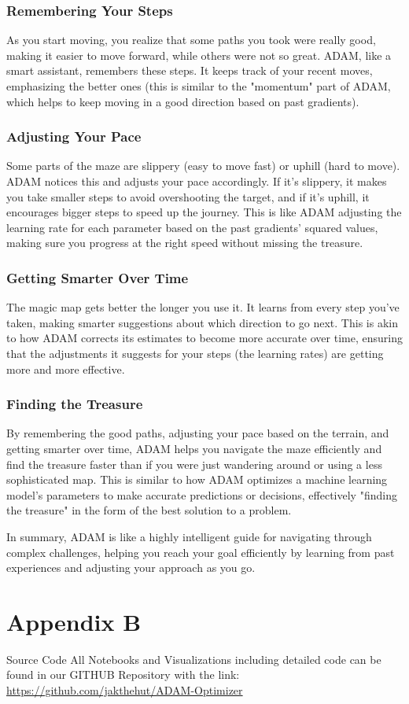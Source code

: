 \documentclass[journal]{IEEEtran}
\begin{document}
\subsubsection*{Remembering Your Steps}
As you start moving, you realize that some paths you took were really good, making it easier to move forward, while others were not so great. ADAM, like a smart assistant, remembers these steps. It keeps track of your recent moves, emphasizing the better ones (this is similar to the "momentum" part of ADAM, which helps to keep moving in a good direction based on past gradients).

\subsubsection*{Adjusting Your Pace}
Some parts of the maze are slippery (easy to move fast) or uphill (hard to move). ADAM notices this and adjusts your pace accordingly. If it's slippery, it makes you take smaller steps to avoid overshooting the target, and if it's uphill, it encourages bigger steps to speed up the journey. This is like ADAM adjusting the learning rate for each parameter based on the past gradients' squared values, making sure you progress at the right speed without missing the treasure.

\subsubsection*{Getting Smarter Over Time}
The magic map gets better the longer you use it. It learns from every step you've taken, making smarter suggestions about which direction to go next. This is akin to how ADAM corrects its estimates to become more accurate over time, ensuring that the adjustments it suggests for your steps (the learning rates) are getting more and more effective.  
   
\subsubsection*{Finding the Treasure}
By remembering the good paths, adjusting your pace based on the terrain, and getting smarter over time, ADAM helps you navigate the maze efficiently and find the treasure faster than if you were just wandering around or using a less sophisticated map. This is similar to how ADAM optimizes a machine learning model's parameters to make accurate predictions or decisions, effectively "finding the treasure" in the form of the best solution to a problem. 
  
In summary, ADAM is like a highly intelligent guide for navigating through complex challenges, helping you reach your goal efficiently by learning from past experiences and adjusting your approach as you go.

\section{Appendix B}
\centering Source Code
All Notebooks and Visualizations including detailed code can be found in our GITHUB Repository with the link: \href{https://github.com/jakthehut/ADAM-Optimizer}{https://github.com/jakthehut/ADAM-Optimizer}
\end{document}

